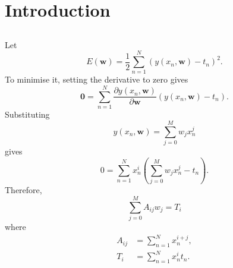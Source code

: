 \section{Introduction}


\subsection{}
\label{1.1}
Let 
%
\begin{equation}
E(\mathbf{w}) = \frac{1}{2} \sum_{n = 1}^{N} \left( y(x_n, \mathbf{w}) - t_n \right) ^ 2.
\end{equation}
%
To minimise it, setting the derivative to zero gives
%
\begin{equation}
\mathbf{0} = \sum_{n = 1}^{N} \frac{\partial y(x_n, \mathbf{w})}{\partial \mathbf{w}} \left( y(x_n, \mathbf{w}) - t_n \right).
\end{equation}
%
Substituting 
%
\begin{equation}
y(x_n, \mathbf{w}) = \sum_{j = 0}^{M} w_j x_n^j
\end{equation}
%
gives
%
\begin{equation}
0 = \sum_{n = 1}^{N} x_n^i \left( \sum_{j = 0}^{M} w_j x_n^j - t_n \right).
\end{equation}
%
Therefore,
%
\begin{equation}
\sum_{j = 0}^{M} A_{ij} w_j = T_i
\end{equation}
%
where
%
\begin{equation}
\begin{aligned}
A_{ij} &= \sum_{n = 1}^{N} x_n^{i + j}, \\
T_i &= \sum_{n = 1}^{N} x_n^i t_n.
\end{aligned}
\end{equation}


